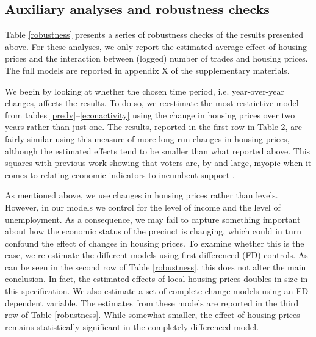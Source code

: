 \documentclass[12pt,a4paper]{article}
\begin{document}
	\subsection{Auxiliary analyses and robustness checks}
	Table \ref{robustness} presents a series of robustness checks of the results presented above. For these analyses, we only report the estimated average effect of housing prices and the interaction between (logged) number of trades and housing prices. The full models are reported in appendix X of the supplementary materials.
	
	
	
	We begin by looking at whether the chosen time period, i.e. year-over-year changes, affects the results. To do so, we reestimate the most restrictive model from tables \ref{predv}--\ref{econactivity} using the change in housing prices over two years rather than just one. The results, reported in the first row in Table 2, are fairly similar using this measure of more long run changes in housing prices, although the estimated effects tend to be smaller than what reported above. This squares with previous work showing that voters are, by and large, myopic when it comes to relating economic indicators to incumbent support \citep{healy2009myopic,healy2014substituting}.
	
	As mentioned above, we use changes in housing prices rather than levels. However, in our models we control for the level of income and the level of unemployment. As a consequence,  we may fail to capture something important about how the economic status of the precinct is changing, which could in turn confound the effect of changes in housing prices. To examine whether this is the case, we re-estimate the different models using first-differenced (FD) controls. As can be seen in the second row of Table \ref{robustness}, this does not alter the main conclusion. In fact, the estimated effects of local housing prices doubles in size in this specification. We also estimate a set of complete change models using an FD dependent variable. The estimates from these models are reported in the third row of Table \ref{robustness}. While somewhat smaller, the effect of housing prices remains statistically significant in the completely differenced model.
	
\end{document}

